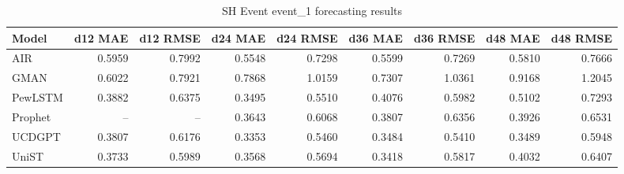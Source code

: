 \begin{table}[htbp]
\centering
\small
\caption{SH Event event\_1 forecasting results}
\label{tab:sh-event-event-1}
\begin{tabular}{lrrrrrrrr}
\toprule
Model & d12 MAE & d12 RMSE & d24 MAE & d24 RMSE & d36 MAE & d36 RMSE & d48 MAE & d48 RMSE \\
\midrule
AIR & 0.5959 & 0.7992 & 0.5548 & 0.7298 & 0.5599 & 0.7269 & 0.5810 & 0.7666 \\
GMAN & 0.6022 & 0.7921 & 0.7868 & 1.0159 & 0.7307 & 1.0361 & 0.9168 & 1.2045 \\
PewLSTM & 0.3882 & 0.6375 & 0.3495 & 0.5510 & 0.4076 & 0.5982 & 0.5102 & 0.7293 \\
Prophet & -- & -- & 0.3643 & 0.6068 & 0.3807 & 0.6356 & 0.3926 & 0.6531 \\
UCDGPT & 0.3807 & 0.6176 & 0.3353 & 0.5460 & 0.3484 & 0.5410 & 0.3489 & 0.5948 \\
UniST & 0.3733 & 0.5989 & 0.3568 & 0.5694 & 0.3418 & 0.5817 & 0.4032 & 0.6407 \\
\bottomrule
\end{tabular}
\end{table}
